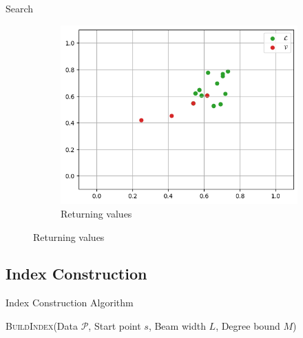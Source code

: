\begin{frame}{Search}
\begin{figure}[h]
\begin{subfigure}{0.31\textwidth}
            \includegraphics[width=\textwidth]{images/greedy-search-final}
            \caption{Returning values}
        \end{subfigure}
        \hfill
    \end{figure}
\end{frame}

\subsection{Index Construction}

\begin{frame}{Index Construction Algorithm}
    \begin{algorithm}[H]
        \caption{\textsc{BuildIndex}(Data \(\mathcal{P}\), Start point \(s\), Beam width \(L\), Degree bound \(M\))}
        \begin{algorithmic}[1]
                 
                 
            \EndFor
        \end{algorithmic}
    \end{algorithm}
\end{frame}

